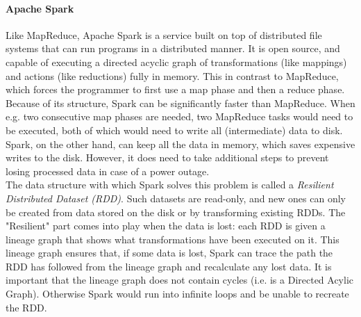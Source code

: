 \paragraph{Apache Spark}
Like MapReduce, Apache Spark is a service built on top of distributed file systems that can run programs in a distributed manner. It is open source, and capable of executing a directed acyclic graph of transformations (like mappings) and actions (like reductions) fully in memory\cite{Sparkwebsite}. This in contrast to MapReduce, which forces the programmer to first use a map phase and then a reduce phase. Because of its structure, Spark can be significantly faster than MapReduce. When e.g. two consecutive map phases are needed, two MapReduce tasks would need to be executed, both of which would need to write all (intermediate) data to disk. Spark, on the other hand, can keep all the data in memory, which saves expensive writes to the disk. However, it does need to take additional steps to prevent losing processed data in case of a power outage.\\

The data structure with which Spark solves this problem is called a \textit{Resilient Distributed Dataset (RDD)}. Such datasets are read-only, and new ones can only be created from data stored on the disk or by transforming existing RDDs\cite{Zaha12}. The "Resilient" part comes into play when the data is lost: each RDD is given a lineage graph that shows what transformations have been executed on it. This lineage graph ensures that, if some data is lost, Spark can trace the path the RDD has followed from the lineage graph and recalculate any lost data. It is important that the lineage graph does not contain cycles (i.e. is a Directed Acylic Graph). Otherwise Spark would run into infinite loops and be unable to recreate the RDD.
